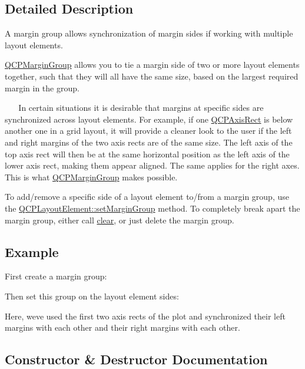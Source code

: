 \subsection{Detailed Description}
A margin group allows synchronization of margin sides if working with multiple layout elements. 

\hyperlink{classQCPMarginGroup}{Q\+C\+P\+Margin\+Group} allows you to tie a margin side of two or more layout elements together, such that they will all have the same size, based on the largest required margin in the group.

~\newline
~\newline
 In certain situations it is desirable that margins at specific sides are synchronized across layout elements. For example, if one \hyperlink{classQCPAxisRect}{Q\+C\+P\+Axis\+Rect} is below another one in a grid layout, it will provide a cleaner look to the user if the left and right margins of the two axis rects are of the same size. The left axis of the top axis rect will then be at the same horizontal position as the left axis of the lower axis rect, making them appear aligned. The same applies for the right axes. This is what \hyperlink{classQCPMarginGroup}{Q\+C\+P\+Margin\+Group} makes possible.

To add/remove a specific side of a layout element to/from a margin group, use the \hyperlink{classQCPLayoutElement_a516e56f76b6bc100e8e71d329866847d}{Q\+C\+P\+Layout\+Element\+::set\+Margin\+Group} method. To completely break apart the margin group, either call \hyperlink{classQCPMarginGroup_a144b67f216e4e86c3a3a309e850285fe}{clear}, or just delete the margin group.\hypertarget{classQCPMarginGroup_QCPMarginGroup-example}{}\subsection{Example}\label{classQCPMarginGroup_QCPMarginGroup-example}
First create a margin group\+: 
\begin{DoxyCodeInclude}
\end{DoxyCodeInclude}
Then set this group on the layout element sides\+: 
\begin{DoxyCodeInclude}
\end{DoxyCodeInclude}
Here, we\textquotesingle{}ve used the first two axis rects of the plot and synchronized their left margins with each other and their right margins with each other. 

\subsection{Constructor \& Destructor Documentation}
\hypertarget{classQCPMarginGroup_ac481c20678ec5b305d6df330715f4b7b}{}
